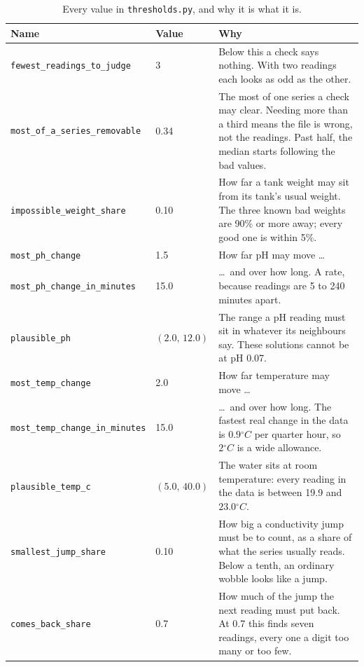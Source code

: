 \begin{table}[htbp]
  \centering
  \caption{Every value in \texttt{thresholds.py}, and why it is what it is.}
  \label{tab:thresholds}
  \footnotesize
  \begin{tabular}{@{}llp{}@{}}
    \toprule
    Name & Value & Why \\
    \midrule
    \texttt{fewest\_readings\_to\_judge} & 3
      & Below this a check says nothing. With two readings each looks as odd as the other. \\
    \texttt{most\_of\_a\_series\_removable} & 0.34
      & The most of one series a check may clear. Needing more than a third means the file
        is wrong, not the readings. Past half, the median starts following the bad values. \\
    \texttt{impossible\_weight\_share} & 0.10
      & How far a tank weight may sit from its tank's usual weight. The three known bad
        weights are 90\% or more away; every good one is within 5\%. \\
    \texttt{most\_ph\_change} & 1.5
      & How far pH may move \ldots \\
    \texttt{most\_ph\_change\_in\_minutes} & 15.0
      & \ldots\ and over how long. A rate, because readings are 5 to 240 minutes apart. \\
    \texttt{plausible\_ph} & $(2.0,\,12.0)$
      & The range a pH reading must sit in whatever its neighbours say. These solutions cannot
        be at pH 0.07. \\
    \texttt{most\_temp\_change} & 2.0
      & How far temperature may move \ldots \\
    \texttt{most\_temp\_change\_in\_minutes} & 15.0
      & \ldots\ and over how long. The fastest real change in the data is $0.9\unit{^\circ C}$
        per quarter hour, so $2\unit{^\circ C}$ is a wide allowance. \\
    \texttt{plausible\_temp\_c} & $(5.0,\,40.0)$
      & The water sits at room temperature: every reading in the data is between 19.9 and
        $23.0\unit{^\circ C}$. \\
    \texttt{smallest\_jump\_share} & 0.10
      & How big a conductivity jump must be to count, as a share of what the series usually
        reads. Below a tenth, an ordinary wobble looks like a jump. \\
    \texttt{comes\_back\_share} & 0.7
      & How much of the jump the next reading must put back. At 0.7 this finds seven readings,
        every one a digit too many or too few. \\

\end{tabular}
\end{table}
